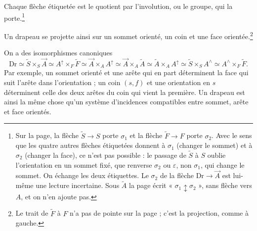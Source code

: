 \documentclass[11pt,a4paper]{article}
\begin{document}

Chaque flèche étiquetée est le quotient par l'involution, ou le groupe, qui la
porte.\footnote{Sur la page, la flèche $\widetilde{S} \to S$ porte $\sigma_{1}$
et la flèche $\widetilde{F} \to F$ porte $\sigma_{2}$. Avec le sens que les
quatre autres flèches étiquetées donnent à $\sigma_{1}$ (changer le sommet) et
à $\sigma_{2}$ (changer la face), ce n'est pas possible : le passage de
$\widetilde{S}$ à $S$ oublie l'orientation en un sommet fixé, que renverse
$\sigma_{2}$ ou $\varepsilon$, non $\sigma_{1}$, qui change le sommet. On
échange les deux étiquettes. Le $\sigma_{2}$ de la flèche
$\mathrm{Dr} \to \vec{A}$ est lui-même une lecture incertaine. Sous
$\widetilde{A}$ la page écrit « $\sigma_{1} \updownarrow \sigma_{2}$ », sans
flèche vers $A$, et on n'en ajoute pas.}


Un drapeau se projette ainsi sur un sommet orienté, un coin et une face orientée.\footnote{Le trait de $\widetilde{F}$ à $F$ n'a pas de pointe sur la page ; c'est
la projection, comme à gauche.}

On a des isomorphismes canoniques
\[
  \mathrm{Dr} \simeq \widetilde{S} \times_{S} \vec{A} \simeq A^{\uparrow}
  \times_{F} \widetilde{F} \simeq \vec{A} \times_{A} A^{\uparrow} \simeq \vec{A}
  \times_{A} \widetilde{A} \simeq \widetilde{A} \times_{A} A^{\uparrow} \simeq
  \widetilde{S} \times_{S} A^{\wedge} \simeq A^{\wedge} \times_{F} \widetilde{F}.
\]
Par exemple, un sommet orienté et une arête qui en part déterminent la face qui
suit l'arête dans l'orientation ; un coin $(s, f)$ et une orientation en $s$
déterminent celle des deux arêtes du coin qui vient la première. Un drapeau
est ainsi la même chose qu'un système d'incidences compatibles entre sommet,
arête et face orientés.
\end{document}
